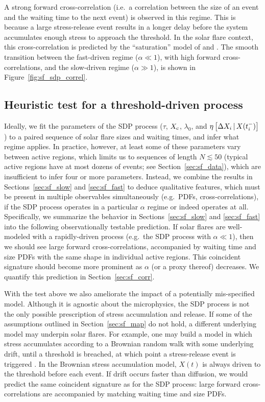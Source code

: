 A strong forward cross-correlation (i.e.~a correlation between the size of an event and the waiting time to the next event) is observed in this regime. This is because a large stress-release event results in a longer delay before the system accumulates enough stress to approach the threshold. In the solar flare context, this cross-correlation is predicted by the ``saturation'' model of \citet{Hudson1998} and \citet{Hudson2019}.  The smooth transition between the fast-driven regime ($\alpha \ll 1$), with high forward cross-correlations, and the slow-driven regime ($\alpha \gg 1$), is shown in Figure~\ref{fig:sf_sdp_correl}.

\subsection{Heuristic test for a threshold-driven process} \label{sec:sf_heur}
Ideally, we fit the parameters of the SDP process ($\tau$, $X_\textrm{c}$, $\lambda_0$, and $\eta\left[\Delta X_{i}\,|\,X(t_i^-)\right]$) to a paired sequence of solar flare sizes and waiting times, and infer what regime applies. In practice, however, at least some of these parameters vary between active regions, which limits us to sequences of length $N \lesssim 50$ (typical active regions have at most dozens of events; see Section~\ref{sec:sf_data}), which are insufficient to infer four or more parameters. Instead, we combine the results in Sections~\ref{sec:sf_slow} and \ref{sec:sf_fast} to deduce qualitative features, which must be present in multiple observables simultaneously (e.g.~PDFs, cross-correlations), if the SDP process operates in a particular $\alpha$ regime or indeed operates at all. Specifically, we summarize the behavior in Sections~\ref{sec:sf_slow} and \ref{sec:sf_fast} into the following observationally testable prediction. If solar flares are well-modeled with a rapidly-driven process (e.g.~the SDP process with $\alpha \ll 1$), then we should see large forward cross-correlations, accompanied by waiting time and size PDFs with the same shape in individual active regions. This coincident signature should become more prominent as $\alpha$ (or a proxy thereof) decreases. We quantify this prediction in Section~\ref{sec:sf_corr}.

With the test above we also ameliorate the impact of a potentially mis-specified model. Although it is agnostic about the microphysics, the SDP process is not the only possible prescription of stress accumulation and release. If some of the assumptions outlined in Section~\ref{sec:sf_map} do not hold, a different underlying model may underpin solar flares. For example, one may build a model in which stress accumulates according to a Brownian random walk with some underlying drift, until a threshold is breached, at which point a stress-release event is triggered \citep{Carlin2020bsa}. In the Brownian stress accumulation model, $X(t)$ is always driven to the threshold before each event. If drift occurs faster than diffusion, we would predict the same coincident signature as for the SDP process: large forward cross-correlations are accompanied by matching waiting time and size PDFs.


